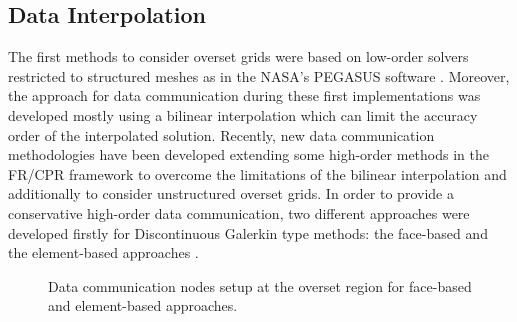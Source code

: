 \subsection{Data Interpolation}
The first methods to consider overset grids were based on low-order solvers restricted to structured meshes as in the NASA's PEGASUS software \cite{Suhs2003}. Moreover, the approach for data communication during these first implementations was developed mostly using a bilinear interpolation which can limit the accuracy order of the interpolated solution. Recently, new data communication methodologies have been developed extending some high-order methods in the FR/CPR framework to overcome the limitations of the bilinear interpolation and additionally to consider unstructured overset grids. In order to provide a conservative high-order data communication, two different approaches were developed firstly for Discontinuous Galerkin type methods: the face-based \cite{Galbraith2013} and the element-based approaches \cite{Nastase2016, Brazell2016}. 
%
\begin{figure}[H]
	\centering
    \caption{Data communication nodes setup at the overset region for face-based and element-based approaches.}
    \label{fig:data_communication}
\end{figure}

